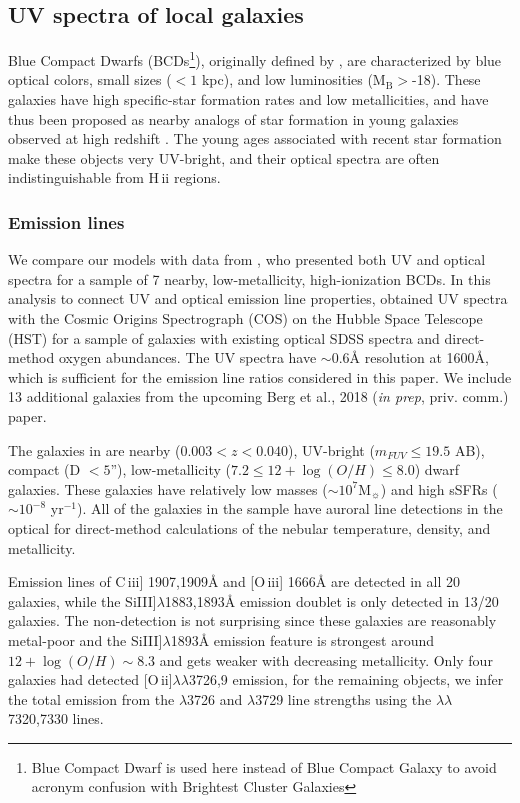 \documentclass[preprint2,trackchanges]{aastex62}
\newcommand{\hii}{H\,{\sc ii}\xspace}
\newcommand{\oiii}{[O\,{\sc iii}]\xspace}
\newcommand{\oii}{[O\,{\sc ii}]\xspace}
\newcommand{\ciii}{C\,{\sc iii}]\xspace}
\newcommand\Msun{\ensuremath{\mathrm{M_{\sun}}}\xspace}
\newcommand{\ang}{\ensuremath{\mbox{\AA}}\xspace}
\begin{document}
\subsection{UV spectra of local galaxies} \label{sec:obs:UV}

Blue Compact Dwarfs (BCDs\footnote{Blue Compact Dwarf is used here instead of Blue Compact Galaxy to avoid acronym confusion with Brightest Cluster Galaxies}), originally defined by \citet{Sargent+1970}, are characterized by blue optical colors, small sizes ($< 1$ kpc), and low luminosities (M$_{\mathrm{B}}>$-18). These galaxies have high specific-star formation rates and low metallicities, and have thus been proposed as nearby analogs of star formation in young galaxies observed at high redshift \citep{Thuan+2008}. The young ages associated with recent star formation make these objects very UV-bright, and their optical spectra are often indistinguishable from \hii regions. 

\subsubsection{Emission lines} \label{sec:obs:emis}

We compare our models with data from \citet{Berg+2016}, who presented both UV and optical spectra for a sample of 7 nearby, low-metallicity, high-ionization BCDs. In this analysis to connect UV and optical emission line properties, \citet{Berg+2016} obtained UV spectra with the Cosmic Origins Spectrograph (COS) on the Hubble Space Telescope (HST) for a sample of galaxies with existing optical SDSS spectra and direct-method oxygen abundances. The UV spectra have ${\sim}0.6$\ang resolution at 1600\ang, which is sufficient for the emission line ratios considered in this paper. We include 13 additional galaxies from the upcoming Berg et al., 2018 (\emph{in prep}, priv. comm.) paper.

The galaxies in \citet{Berg+2016} are nearby ($0.003 < z < 0.040$), UV-bright ($m_{FUV} \leq 19.5$ AB), compact (D $< 5$''), low-metallicity ($7.2 \leq 12 + \log(O/H) \leq 8.0$) dwarf galaxies. These galaxies have relatively low masses (${\sim}10^7$\Msun) and high sSFRs (${\sim}10^{-8}$ yr$^{-1}$). All of the galaxies in the sample have auroral line detections in the optical for direct-method calculations of the nebular temperature, density, and metallicity.

Emission lines of \ciii 1907,1909\ang and \oiii 1666\ang are detected in all 20 galaxies, while the Si\textsc{III}]$\lambda$1883,1893\ang emission doublet is only detected in 13/20 galaxies. The non-detection is not surprising since these galaxies are reasonably metal-poor and the Si\textsc{III}]$\lambda$1893\ang emission feature is strongest around $12 + \log(O/H){\sim}8.3$ and gets weaker with decreasing metallicity. Only four galaxies had detected \oii$\lambda\lambda$3726,9  emission, for the remaining objects, we infer the total emission from the $\lambda$3726 and $\lambda$3729 line strengths using the $\lambda\lambda$7320,7330 lines.
\end{document}
